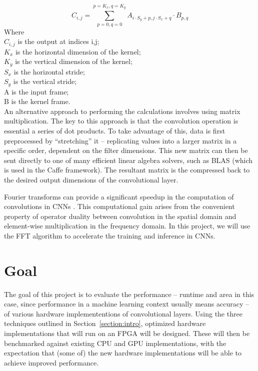 \documentclass[conference,compsoc]{IEEEtran/IEEEtran}
\begin{document}
\begin{equation}\label{eq:conv}
C_{i,j} = \sum_{p=0,q=0}^{p=K_x,q=K_y}A_{i\cdot S_y + p, j\cdot S_x + q}\cdot B_{p,q}
\end{equation}
Where\\
\hspace*{2em} $C_{i,j}$ is the output at indices i,j;\\
\hspace*{2em} $K_x$ is the horizontal dimension of the kernel;\\
\hspace*{2em} $K_y$ is the vertical dimension of the kernel;\\
\hspace*{2em} $S_x$ is the horizontal stride;\\
\hspace*{2em} $S_y$ is the vertical stride;\\
\hspace*{2em} A is the input frame;\\
\hspace*{2em} B is the kernel frame.\\

An alternative approach to performing the calculations involves using matrix multiplication.
The key to this approach is that the convolution operation is essential a series of dot products.
To take advantage of this, data is first preprocessed by ``stretching'' it -- replicating values into a larger matrix in a specific order, dependent on the filter dimensions.
This new matrix can then be sent directly to one of many efficient linear algebra solvers, such as BLAS (which is used in the Caffe framework).
The resultant matrix is the compressed back to the desired output dimensions of the convolutional layer.

Fourier transforms can provide a significant speedup in the computation of convolutions in CNNs \cite{FFT1, FFT2}. This computational gain arises from the convenient property of operator duality between convolution in the spatial domain and element-wise multiplication in the frequency domain. In this project, we will use the FFT algorithm to accelerate the training and inference in CNNs.


\section{Goal}\label{section:goal}

The goal of this project is to evaluate the performance -- runtime and area in this case, since performance in a machine learning context usually means accuracy -- of various hardware implemententions of convolutional layers.
Using the three techniques outlined in Section~\ref{section:intro}, optimized hardware implementations that will run on an FPGA will be designed.
These will then be benchmarked against existing CPU and GPU implementations, with the expectation that (some of) the new hardware implementations will be able to achieve improved performance.
\end{document}
